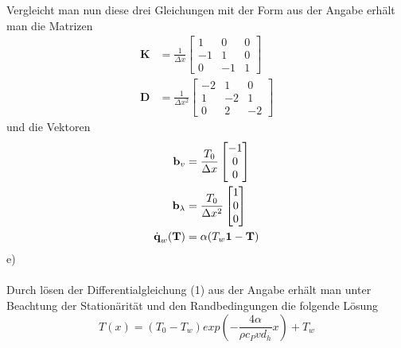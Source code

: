 Vergleicht man nun diese drei Gleichungen mit der Form aus der Angabe erhält man die Matrizen
\begin{align*}
	\textbf{K} &= \frac{1}{\Delta x}\begin{bmatrix}
		1 & 0 & 0 \\
		-1 & 1 & 0 \\
		0 & -1 & 1 
	\end{bmatrix}
	\\
	\textbf{D} &= \frac{1}{\Delta x^2}\begin{bmatrix}
		-2 & 1 & 0 \\
		1 & -2 & 1 \\
		0 & 2 & -2 
	\end{bmatrix}
\end{align*}
und die Vektoren
\begin{align*}
	\textbf{b}_v &= \frac{T_0}{\Delta x}\begin{bmatrix}
		-1 \\
		0 \\
		0
	\end{bmatrix}
	\\
	\textbf{b}_\lambda &= \frac{T_0}{\Delta x^2}\begin{bmatrix}
		1 \\
		0 \\
		0
	\end{bmatrix}
	\\
	\dot{\textbf{q}}_w(\textbf{T}) &= \alpha (T_w\textbf{\text{1}} - \textbf{T})
\end{align*}
e) \\ \\
Durch lösen der Differentialgleichung (1) aus der Angabe erhält man unter Beachtung der Stationärität und den Randbedingungen die folgende Lösung
\[
	T(x) = (T_0 - T_w)exp\left(-\frac{4\alpha}{\rho c_P v d_h}x\right) + T_w
\]